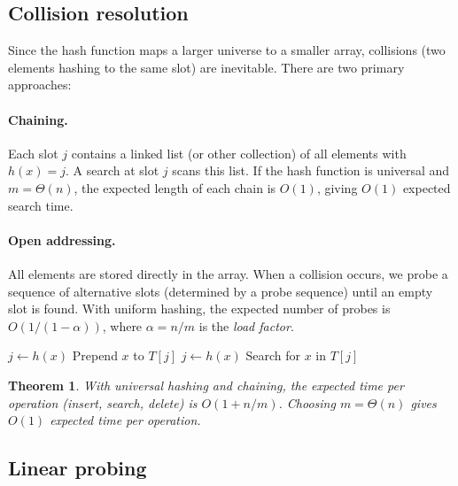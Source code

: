 \documentclass[twoside,12pt]{book}
\theoremstyle{plain}
\newtheorem{theorem}{Theorem}[chapter]
\theoremstyle{definition}
\theoremstyle{remark}
\begin{document}
\subsection{Collision resolution}

Since the hash function maps a larger universe to a smaller array, collisions (two elements hashing to the same slot) are inevitable. There are two primary approaches:

\paragraph{Chaining.} Each slot $j$ contains a linked list (or other collection) of all elements with $h(x) = j$. A search at slot $j$ scans this list. If the hash function is universal and $m = \Theta(n)$, the expected length of each chain is $O(1)$, giving $O(1)$ expected search time.

\paragraph{Open addressing.} All elements are stored directly in the array. When a collision occurs, we probe a sequence of alternative slots (determined by a probe sequence) until an empty slot is found. With uniform hashing, the expected number of probes is $O(1/(1-\alpha))$, where $\alpha = n/m$ is the \emph{load factor}.

\begin{algorithm}[H]
\caption{Hash Table with Chaining}
\begin{algorithmic}[1]
    \State $j \gets h(x)$
    \State Prepend $x$ to $T[j]$
\EndFunction
\State
{}
    \State $j \gets h(x)$
    \State Search for $x$ in $T[j]$
    \State {}
\EndFunction
\end{algorithmic}
\end{algorithm}

\begin{theorem}\label{thm:hash-table}
With universal hashing and chaining, the expected time per operation (insert, search, delete) is $O(1 + n/m)$. Choosing $m = \Theta(n)$ gives $O(1)$ expected time per operation.
\end{theorem}

\subsection{Linear probing}
\end{document}
